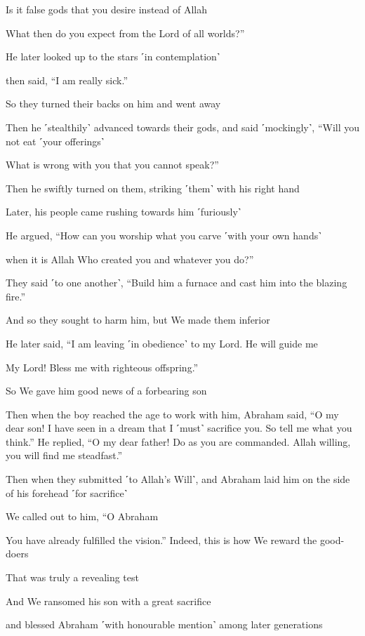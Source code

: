 Is it false gods that you desire instead of Allah

What then do you expect from the Lord of all worlds?”

He later looked up to the stars ˹in contemplation˺

then said, “I am really sick.”

So they turned their backs on him and went away

Then he ˹stealthily˺ advanced towards their gods, and said ˹mockingly˺, “Will you not eat ˹your offerings˺

What is wrong with you that you cannot speak?”

Then he swiftly turned on them, striking ˹them˺ with his right hand

Later, his people came rushing towards him ˹furiously˺

He argued, “How can you worship what you carve ˹with your own hands˺

when it is Allah Who created you and whatever you do?”

They said ˹to one another˺, “Build him a furnace and cast him into the blazing fire.”

And so they sought to harm him, but We made them inferior

He later said, “I am leaving ˹in obedience˺ to my Lord. He will guide me

My Lord! Bless me with righteous offspring.”

So We gave him good news of a forbearing son

Then when the boy reached the age to work with him, Abraham said, “O my dear son! I have seen in a dream that I ˹must˺ sacrifice you. So tell me what you think.” He replied, “O my dear father! Do as you are commanded. Allah willing, you will find me steadfast.”

Then when they submitted ˹to Allah’s Will˺, and Abraham laid him on the side of his forehead ˹for sacrifice˺

We called out to him, “O Abraham

You have already fulfilled the vision.” Indeed, this is how We reward the good-doers

That was truly a revealing test

And We ransomed his son with a great sacrifice

and blessed Abraham ˹with honourable mention˺ among later generations

